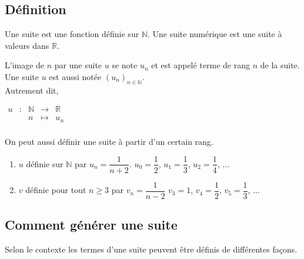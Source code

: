 \documentclass[french]{book}
\newcommand{\R}{\mathbb {R}}
\newcommand{\N}{\mathbb {N}}
\newcommand{\se}{\geq}
\newcommand{\suite}[1][u]{\left( #1_{n} \right)_{n\in\N}}
\begin{document}
\subsection{Définition}
\begin{defn}
Une suite est une fonction définie sur $\N$. Une suite numérique est une suite à valeurs dans $\R$.

 L'image de $n$ par une suite $u$ se note $u_{n}$ et est appelé terme de rang $n$ de la suite. Une suite $u$ est aussi notée $\suite[u]$.\\
 
Autrement dit, 
\begin{center}
$\begin{array}{ccccc}
u & : & \mathbb{N} & \to & \mathbb{R} \\
 & & n & \mapsto & u_n\\
\end{array}$
\end{center}
\end{defn}

\begin{rem}
On peut aussi définir une suite à partir d'un certain rang.
\end{rem}

\begin{exemple}
\begin{enumerate}
\item $u$ définie sur $\N$ par $u_{n}=\dfrac{1}{n+2}$.
\hspace{2em} $u_0=\dfrac{1}{2}$, $u_1=\dfrac{1}{3}$, $u_2=\dfrac{1}{4}$, ...
\item $v$ définie pour tout $n\se3$ par $v_{n}=\dfrac{1}{n-2}$
\hspace{2em} $v_3=1$, $v_4=\dfrac{1}{2}$, $v_5=\dfrac{1}{3}$, ...
\end{enumerate}
\end{exemple}


\subsection{Comment générer une suite}
Selon le contexte les termes d'une suite peuvent être définis de différentes façons.
\end{document}
